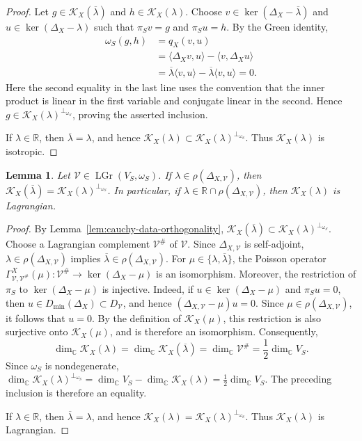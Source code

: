 \documentclass[10pt,a4paper]{amsart}
\newtheorem{lem}[thm]{Lemma}
\numberwithin{equation}{section} \numberwithin{figure}{section}
\renewcommand*{\to}{\rightarrow}
\newcommand{\mb}[1]{\mathbb{#1}} %
\newcommand{\mc}[1]{\mathcal{#1}}
\begin{document}
\begin{proof}
Let \(g\in\mc K_X(\overline{\lambda})\) and
\(h\in\mc K_X(\lambda)\). Choose
\(v\in\ker(\Delta_X-\overline{\lambda})\) and
\(u\in\ker(\Delta_X-\lambda)\) such that
\(\pi_Sv=g\) and \(\pi_Su=h\). By the Green identity,
\[
\begin{aligned}
\omega_S(g,h)
&=
q_X(v,u) \\
&=
\langle\Delta_Xv,u\rangle
-
\langle v,\Delta_Xu\rangle \\
&=
\overline{\lambda}\langle v,u\rangle
-
\overline{\lambda}\langle v,u\rangle
=
0.
\end{aligned}
\]
Here the second equality in the last line uses the convention that
the inner product is linear in the first variable and conjugate
linear in the second. Hence
\(g\in\mc K_X(\lambda)^{\perp_{\omega_S}}\), proving the asserted
inclusion.

If \(\lambda\in\mb R\), then
\(\overline{\lambda}=\lambda\), and hence
\(\mc K_X(\lambda)
\subset\mc K_X(\lambda)^{\perp_{\omega_S}}\).
Thus \(\mc K_X(\lambda)\) is isotropic.
\end{proof}

\begin{lem}\label{lem:cauchy-data-orthogonal-complement}
Let \(\mc V\in\operatorname{LGr}(V_S,\omega_S)\). If
\(\lambda\in\rho(\Delta_{X,\mc V})\), then
\(\mc K_X(\overline{\lambda})
=\mc K_X(\lambda)^{\perp_{\omega_S}}\).
In particular, if
\(\lambda\in\mb R\cap\rho(\Delta_{X,\mc V})\), then
\(\mc K_X(\lambda)\) is Lagrangian.
\end{lem}
\begin{proof}
By Lemma~\ref{lem:cauchy-data-orthogonality},
\(\mc K_X(\overline{\lambda})
\subset\mc K_X(\lambda)^{\perp_{\omega_S}}\).
Choose a Lagrangian complement \(\mc V^\#\) of \(\mc V\). Since
\(\Delta_{X,\mc V}\) is self-adjoint,
\(\lambda\in\rho(\Delta_{X,\mc V})\) implies
\(\overline{\lambda}\in\rho(\Delta_{X,\mc V})\). For
\(\mu\in\{\lambda,\overline{\lambda}\}\), the Poisson operator
\(\Gamma_{\mc V,\mc V^\#}^X(\mu):
\mc V^\#\to\ker(\Delta_X-\mu)\)
is an isomorphism.
Moreover, the restriction of \(\pi_S\) to
\(\ker(\Delta_X-\mu)\) is injective. Indeed, if
\(u\in\ker(\Delta_X-\mu)\) and \(\pi_Su=0\), then
\(u\in D_{\min}(\Delta_X)\subset D_{\mc V}\), and hence
\((\Delta_{X,\mc V}-\mu)u=0\). Since
\(\mu\in\rho(\Delta_{X,\mc V})\), it follows that \(u=0\).
By the definition of \(\mc K_X(\mu)\), this restriction is also
surjective onto \(\mc K_X(\mu)\), and is therefore an isomorphism.
Consequently,
\[
\dim_{\mb C}\mc K_X(\lambda)
=
\dim_{\mb C}\mc K_X(\overline{\lambda})
=
\dim_{\mb C}\mc V^\#
=
\frac12\dim_{\mb C}V_S.
\]
Since \(\omega_S\) is nondegenerate,
\(\dim_{\mb C}\mc K_X(\lambda)^{\perp_{\omega_S}}
=\dim_{\mb C}V_S-\dim_{\mb C}\mc K_X(\lambda)
=\frac12\dim_{\mb C}V_S\).
The preceding inclusion is therefore an equality.

If \(\lambda\in\mb R\), then
\(\overline{\lambda}=\lambda\), and hence
\(\mc K_X(\lambda)
=\mc K_X(\lambda)^{\perp_{\omega_S}}\).
Thus \(\mc K_X(\lambda)\) is Lagrangian.
\end{proof}
\end{document}
